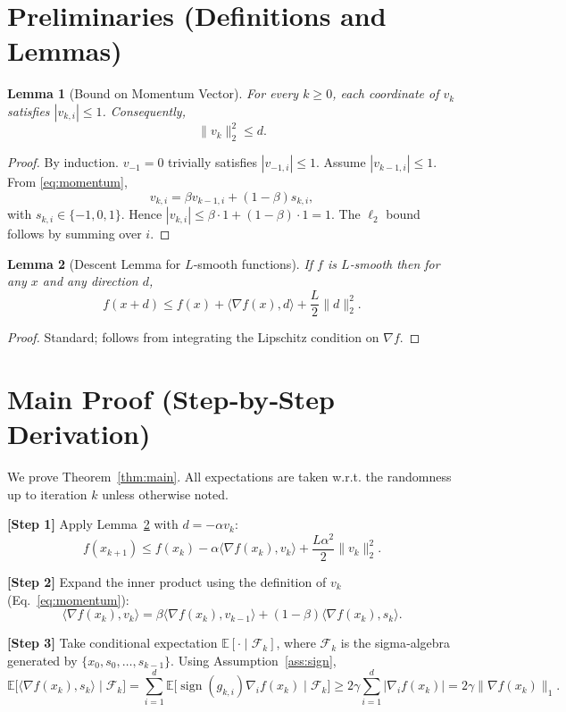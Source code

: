 \documentclass[11pt]{article}
\newtheorem{lemma}{Lemma}
\newcommand{\sign}{\operatorname{sign}}
\newcommand{\E}{\mathbb{E}}
\begin{document}
\section{Preliminaries (Definitions and Lemmas)}
\begin{lemma}[Bound on Momentum Vector]\label{lem:boundmom}
For every $k\ge0$, each coordinate of $v_k$ satisfies $|v_{k,i}|\le1$. Consequently,
\[
\|v_k\|_2^{2}\le d.
\]
\end{lemma}
\begin{proof}
By induction. $v_{-1}=0$ trivially satisfies $|v_{-1,i}|\le1$. Assume $|v_{k-1,i}|\le1$. From \eqref{eq:momentum},
\[
v_{k,i}= \beta v_{k-1,i}+(1-\beta)s_{k,i},
\]
with $s_{k,i}\in\{-1,0,1\}$. Hence $|v_{k,i}|\le \beta\cdot1+(1-\beta)\cdot1=1$. The $\ell_2$ bound follows by summing over $i$.
\end{proof}

\begin{lemma}[Descent Lemma for $L$‑smooth functions]\label{lem:smooth}
If $f$ is $L$‑smooth then for any $x$ and any direction $d$,
\[
f(x+d)\le f(x)+\langle\nabla f(x),d\rangle+\frac{L}{2}\|d\|_2^{2}.
\]
\end{lemma}
\begin{proof}
Standard; follows from integrating the Lipschitz condition on $\nabla f$.
\end{proof}

\section{Main Proof (Step‑by‑Step Derivation)}
We prove Theorem~\ref{thm:main}.  All expectations are taken w.r.t. the randomness up to iteration $k$ unless otherwise noted.

\bigskip
\noindent\textbf{[Step 1]} Apply Lemma~\ref{lem:smooth} with $d=-\alpha v_k$:
\begin{equation}
f(x_{k+1})\le f(x_k)-\alpha\langle\nabla f(x_k),v_k\rangle
            +\frac{L\alpha^{2}}{2}\|v_k\|_2^{2}.
\label{eq:smooth}
\end{equation}

\noindent\textbf{[Step 2]} Expand the inner product using the definition of $v_k$ (Eq.~\eqref{eq:momentum}):
\[
\langle\nabla f(x_k),v_k\rangle
  =\beta\langle\nabla f(x_k),v_{k-1}\rangle
   +(1-\beta)\langle\nabla f(x_k),s_k\rangle .
\tag{2.1}
\]

\noindent\textbf{[Step 3]} Take conditional expectation $\E[\cdot\mid\mathcal{F}_k]$, where $\mathcal{F}_k$ is the sigma‑algebra generated by $\{x_0,s_0,\dots,s_{k-1}\}$.
Using Assumption~\ref{ass:sign},
\[
\E\big[\langle\nabla f(x_k),s_k\rangle\mid\mathcal{F}_k\big]
   =\sum_{i=1}^{d}\E\big[\sign(g_{k,i})\nabla_i f(x_k)\mid\mathcal{F}_k\big]
   \ge 2\gamma\sum_{i=1}^{d}|\nabla_i f(x_k)|
   = 2\gamma\|\nabla f(x_k)\|_{1}.
\tag{3.1}
\]
\end{document}
